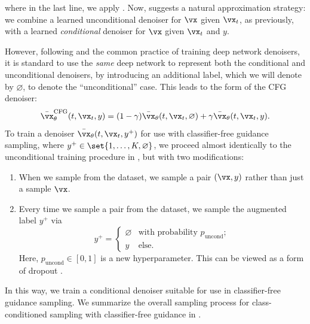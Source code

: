 \documentclass[../../book-main.tex]{subfiles}
\begin{document}
where in the last line, we apply
.
Now,  suggests a natural approximation strategy: we
combine a learned unconditional denoiser for $\vx$ given $\vx_t$, as previously,
with a learned \textit{conditional} denoiser for $\vx$ given $\vx_t$ and $y$.


However, following \textcite{Ho2022-ry} and the common practice of training deep network
denoisers, it is standard to use the \textit{same} deep network to represent
both the conditional and unconditional denoisers, by introducing an additional
label, which we will denote by $\varnothing$, to denote the ``unconditional''
case.
This leads to the form of the CFG denoiser:
\begin{equation}\label{eq:conditional-denoising-mmse-denoiser-paired-data-approx-cfg}
  \bar{\vx}_{\theta}^{\mathrm{CFG}}(t, \vx_t, y)
  =
  (1 - \gamma) \bar{\vx}_{\theta}(t, \vx_t, \varnothing)
  +
  \gamma \bar{\vx}_{\theta}(t, \vx_t, y).
\end{equation}
To train a denoiser $\bar{\vx}_{\theta}(t, \vx_t, y^+)$ for use with
classifier-free guidance sampling, where $y^+ \in
\set{1, \dots, K, \varnothing}$, we proceed almost identically to the
unconditional training procedure in , but with two
modifications:
\begin{enumerate}
  \item When we sample from the dataset, we sample a pair $(\vx, y)$ rather than
    just a sample $\vx$.
  \item Every time we sample a pair from the dataset, we sample the augmented
    label $y^+$ via
    \begin{equation}
      y^+ = \begin{cases}
        \varnothing & \text{with probability } p_{\mathrm{uncond}}; \\
        y & \text{else}.
      \end{cases}
    \end{equation}
    Here, $p_{\mathrm{uncond}} \in [0, 1]$ is a new hyperparameter.
    This can be viewed as a form of dropout \cite{srivastava2014dropout}.
\end{enumerate}
In this way, we train a conditional denoiser suitable for use in classifier-free
guidance sampling. We summarize the overall sampling process for
class-conditioned sampling with classifier-free guidance in
.
\end{document}

